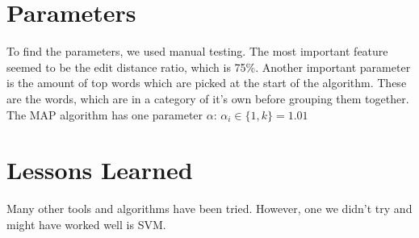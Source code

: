 \documentclass[a4paper, 11pt]{article}
\begin{document}
\section{Parameters}
To find the parameters, we used manual testing. The most important feature seemed to be the edit distance ratio, which is 75\%. Another important parameter is the amount of top words which are picked at the start of the algorithm. These are the words, which are in a category of it's own before grouping them together.
The MAP algorithm has one parameter $\alpha$: $\alpha_i \in \lbrace1, k \rbrace = 1.01$

\section{Lessons Learned}
Many other tools and algorithms have been tried. However, one we didn't try and might have worked well is SVM.
\end{document}
